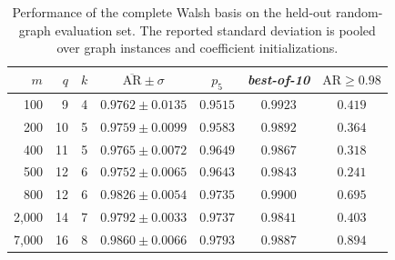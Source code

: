 \begin{table}[!h]
\centering
\caption{Performance of the complete Walsh basis on the held-out random-graph evaluation set. The reported standard deviation is pooled over graph instances and coefficient initializations.}
\label{tab:full_basis_performance}
\begin{tabular}{rrrcccc}
\toprule
$m$ & $q$ & $k$ & $\overline{\mathrm{AR}}\pm\sigma$ & $p_5$ & \emph{best-of-10} & $\mathrm{AR}\geq0.98$ \\
\midrule
100 & 9 & 4 & $0.9762 \pm 0.0135$ & $0.9515$ & $0.9923$ & $0.419$ \\
200 & 10 & 5 & $0.9759 \pm 0.0099$ & $0.9583$ & $0.9892$ & $0.364$ \\
400 & 11 & 5 & $0.9765 \pm 0.0072$ & $0.9649$ & $0.9867$ & $0.318$ \\
500 & 12 & 6 & $0.9752 \pm 0.0065$ & $0.9643$ & $0.9843$ & $0.241$ \\
800 & 12 & 6 & $0.9826 \pm 0.0054$ & $0.9735$ & $0.9900$ & $0.695$ \\
2,000 & 14 & 7 & $0.9792 \pm 0.0033$ & $0.9737$ & $0.9841$ & $0.403$ \\
7,000 & 16 & 8 & $0.9860 \pm 0.0066$ & $0.9793$ & $0.9887$ & $0.894$ \\
\bottomrule
\end{tabular}
\end{table}
